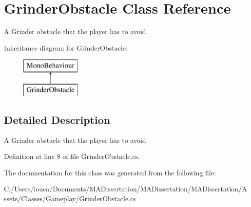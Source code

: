 \hypertarget{class_grinder_obstacle}{}\section{Grinder\+Obstacle Class Reference}
\label{class_grinder_obstacle}


A Grinder obstacle that the player has to avoid  


Inheritance diagram for Grinder\+Obstacle\+:\begin{figure}[H]
\begin{center}
\leavevmode
\includegraphics[height=2.000000cm]{class_grinder_obstacle}
\end{center}
\end{figure}


\subsection{Detailed Description}
A Grinder obstacle that the player has to avoid 



Definition at line 8 of file Grinder\+Obstacle.\+cs.



The documentation for this class was generated from the following file\+:\begin{DoxyCompactItemize}
\item 
C\+:/\+Users/louca/\+Documents/\+M\+A\+Dissertation/\+M\+A\+Dissertation/\+M\+A\+Dissertation/\+Assets/\+Classes/\+Gameplay/Grinder\+Obstacle.\+cs\end{DoxyCompactItemize}
